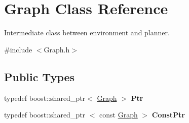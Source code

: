 \hypertarget{class_graph}{\section{\-Graph \-Class \-Reference}
\label{class_graph}
}


\-Intermediate class between environment and planner.  




{\ttfamily \#include $<$\-Graph.\-h$>$}

\subsection*{\-Public \-Types}
\begin{DoxyCompactItemize}
\item 
\hypertarget{class_graph_af4923b657730669fca5b7922bf336c4c}{typedef boost\-::shared\-\_\-ptr$<$ \hyperlink{class_graph}{\-Graph} $>$ {\bfseries \-Ptr}}\label{class_graph_af4923b657730669fca5b7922bf336c4c}

\item 
\hypertarget{class_graph_ac8025fde49dceda321849fb499606896}{typedef boost\-::shared\-\_\-ptr\*
$<$ const \hyperlink{class_graph}{\-Graph} $>$ {\bfseries \-Const\-Ptr}}\label{class_graph_ac8025fde49dceda321849fb499606896}

\end{DoxyCompactItemize}
